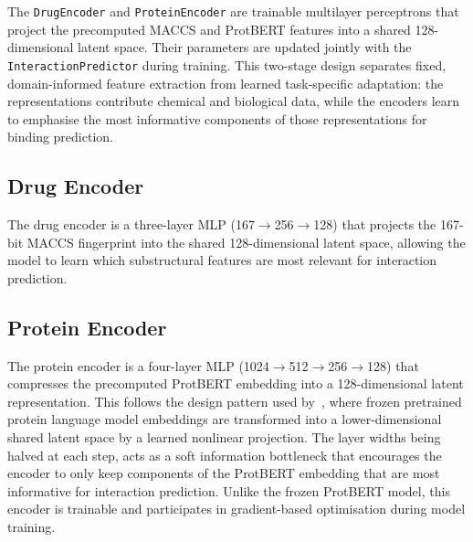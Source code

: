 The \texttt{DrugEncoder} and \texttt{ProteinEncoder} are trainable multilayer perceptrons that project the precomputed MACCS and ProtBERT features into a shared 128-dimensional latent space.
Their parameters are updated jointly with the \texttt{InteractionPredictor} during training.
This two-stage design separates fixed, domain-informed feature extraction from learned task-specific adaptation: the representations contribute chemical and biological data, while the encoders learn to emphasise the most informative components of those representations for binding prediction.

\subsection{Drug Encoder}
The drug encoder is a three-layer MLP (167$\rightarrow$256$\rightarrow$128) that projects the 167-bit MACCS fingerprint into the shared 128-dimensional latent space, allowing the model to learn which substructural features are most relevant for interaction prediction.
\subsection{Protein Encoder}
The protein encoder is a four-layer MLP (1024$\rightarrow$512$\rightarrow$256$\rightarrow$128) that compresses the precomputed ProtBERT embedding into a 128-dimensional latent representation.
This follows the design pattern used by~\citet{Singh2023}, where frozen pretrained protein language model embeddings are transformed into a lower-dimensional shared latent space by a learned nonlinear projection.
The layer widths being halved at each step, acts as a soft information bottleneck that encourages the encoder to only keep components of the ProtBERT embedding that are most informative for interaction prediction.
Unlike the frozen ProtBERT model, this encoder is trainable and participates in gradient-based optimisation during model training.

